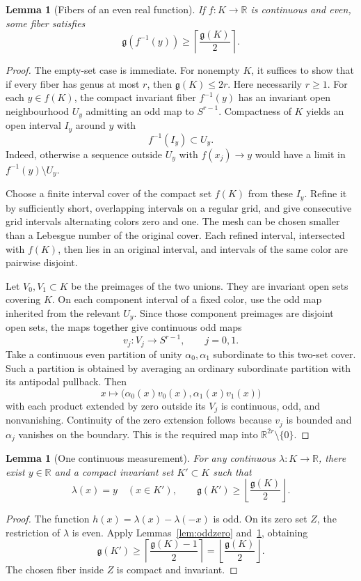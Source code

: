 \documentclass[11pt,a4paper]{article}
\newtheorem{lemma}[theorem]{Lemma}
\theoremstyle{remark}
\newcommand{\R}{\mathbb R}
\newcommand{\gen}{\mathfrak g}
\begin{document}
\begin{lemma}[Fibers of an even real function]\label{lem:evenfiber}
If $f:K\to\R$ is continuous and even, some fiber satisfies
\[
 \gen(f^{-1}(y))\ge\left\lceil\frac{\gen(K)}2\right\rceil.
\]
\end{lemma}
\begin{proof}
The empty-set case is immediate. For nonempty $K$, it suffices to show that if every fiber has genus at most $r$, then $\gen(K)\le2r$. Here necessarily $r\ge1$. For each $y\in f(K)$, the compact invariant fiber $f^{-1}(y)$ has an invariant open neighbourhood $U_y$ admitting an odd map to $S^{r-1}$. Compactness of $K$ yields an open interval $I_y$ around $y$ with
\[
 f^{-1}(I_y)\subset U_y.
\]
Indeed, otherwise a sequence outside $U_y$ with $f(x_j)\to y$ would have a limit in $f^{-1}(y)\setminus U_y$.

Choose a finite interval cover of the compact set $f(K)$ from these $I_y$. Refine it by sufficiently short, overlapping intervals on a regular grid, and give consecutive grid intervals alternating colors zero and one. The mesh can be chosen smaller than a Lebesgue number of the original cover. Each refined interval, intersected with $f(K)$, then lies in an original interval, and intervals of the same color are pairwise disjoint.

Let $V_0,V_1\subset K$ be the preimages of the two unions. They are invariant open sets covering $K$. On each component interval of a fixed color, use the odd map inherited from the relevant $U_y$. Since those component preimages are disjoint open sets, the maps together give continuous odd maps
\[
 v_j:V_j\to S^{r-1},\qquad j=0,1.
\]
Take a continuous even partition of unity $\alpha_0,\alpha_1$ subordinate to this two-set cover. Such a partition is obtained by averaging an ordinary subordinate partition with its antipodal pullback. Then
\[
 x\longmapsto\bigl(\alpha_0(x)v_0(x),\alpha_1(x)v_1(x)\bigr)
\]
with each product extended by zero outside its $V_j$ is continuous, odd, and nonvanishing. Continuity of the zero extension follows because $v_j$ is bounded and $\alpha_j$ vanishes on the boundary. This is the required map into $\R^{2r}\setminus\{0\}$.
\end{proof}

\begin{lemma}[One continuous measurement]\label{lem:onefiber}
For any continuous $\lambda:K\to\R$, there exist $y\in\R$ and a compact invariant set $K'\subset K$ such that
\[
 \lambda(x)=y\quad(x\in K'),\qquad
 \gen(K')\ge\left\lfloor\frac{\gen(K)}2\right\rfloor.
\]
\end{lemma}
\begin{proof}
The function $h(x)=\lambda(x)-\lambda(-x)$ is odd. On its zero set $Z$, the restriction of $\lambda$ is even. Apply Lemmas~\ref{lem:oddzero} and~\ref{lem:evenfiber}, obtaining
\[
 \gen(K')\ge\left\lceil\frac{\gen(K)-1}{2}\right\rceil
 =\left\lfloor\frac{\gen(K)}2\right\rfloor.
\]
The chosen fiber inside $Z$ is compact and invariant.
\end{proof}
\end{document}
